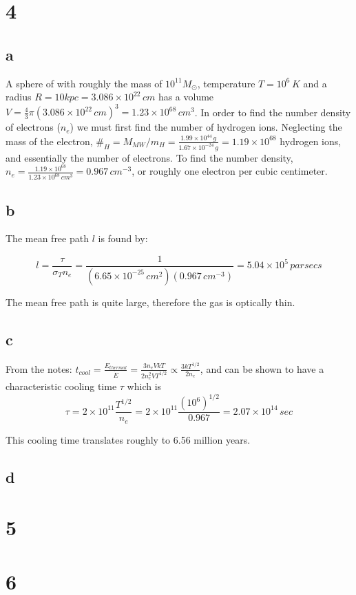 \documentclass{article}
\begin{document}
\section*{4}
\subsection*{a}

A sphere of with roughly the mass of $10^{11} M_{\odot}$, temperature $T=10^6 \, K$ and a radius $R = 10 kpc = 3.086 \times 10^{22} \, cm$ has a volume $V = \frac{4}{3} \pi (3.086 \times 10^{22} \, cm)^3 = 1.23 \times 10^{68} \, cm^3 $. In order to find the number density of electrons ($n_e$) we must first find the number of hydrogen ions. Neglecting the mass of the electron, $ \#_H = M_{MW} / m_H = \frac{1.99 \times 10^{44} \, g}{1.67 \times 10^{-24} \, g} = 1.19 \times 10^{68}$ hydrogen ions, and essentially the number of electrons. To find the number density, $n_e = \frac{1.19 \times 10^{68}}{1.23 \times 10^{68} \, cm^3} = 0.967 \, cm^{-3}$, or roughly one electron per cubic centimeter.

\subsection*{b}

The mean free path $l$ is found by:

\begin{equation}
l = \frac{\tau}{\sigma_T n_e } = \frac{1}{(6.65 \times 10^{-25} \,cm^2)(0.967 \, cm^{-3})} = 5.04 \times 10^5 \, parsecs
\end{equation}

The mean free path is quite large, therefore the gas is optically thin.

\subsection*{c}

From the notes: $t_{cool} = \frac{E_{thermal}}{\dot{E}}= \frac{3n_e V k T}{2n_e^2 V T^{1/2}} \propto \frac{3kT^{1/2}}{2n_e}$, and can be shown to have a characteristic cooling time $\tau$ which is
\begin{equation}
\tau = 2 \times 10^{11} \frac{T^{1/2}}{n_e} = 2 \times 10^{11} \frac{(10^6)^{1/2}}{0.967} = 2.07 \times 10^{14} \, sec
\end{equation}

This cooling time translates roughly to 6.56 million years.


\subsection*{d}

\section*{5}

\section*{6}
\end{document}
